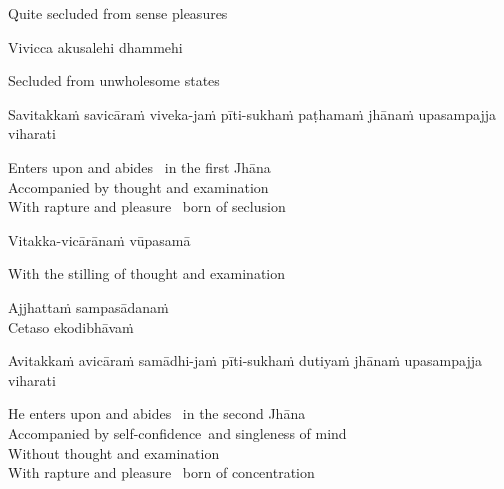 \begin{english}
  Quite secluded from sense pleasures
\end{english}

Vivicca akusalehi dhammehi

\begin{english}
  Secluded from unwholesome states
\end{english}

\begin{pali-hang}
  Savitakkaṁ savicāraṁ viveka-jaṁ pīti-sukhaṁ paṭhamaṁ jhānaṁ upasampajja viharati
\end{pali-hang}

\begin{english-verses}
  Enters upon and abides \breathmark\ in the first Jhāna\\
  Accompanied by thought and examination\\
  With rapture and pleasure \breathmark\ born of seclusion
\end{english-verses}

Vitakka-vicārānaṁ vūpasamā

\begin{english}
  With the stilling of thought and examination
\end{english}

Ajjhattaṁ sampasādanaṁ\\
Cetaso ekodibhāvaṁ
\begin{pali-hangtogether}
  Avitakkaṁ avicāraṁ samādhi-jaṁ pīti-sukhaṁ dutiyaṁ jhānaṁ upasampajja viharati
\end{pali-hangtogether}

\begin{english-verses}
  He enters upon and abides \breathmark\ in the second Jhāna\\
  Accompanied by self-confidence\makeatletter\hyperlink{endnote154-appendix}\makeatother \breathmark\ and singleness of mind\\
  Without thought and examination\\
  With rapture and pleasure \breathmark\ born of concentration
\end{english-verses}

